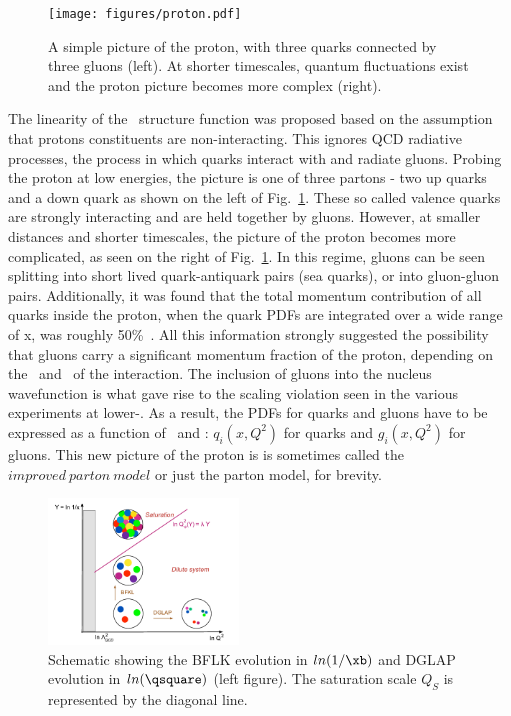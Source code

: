 \begin{figure}
	\centerline{
		\texttt{[image: figures/proton.pdf]} 
	}
	\caption{A simple picture of the proton, with three quarks connected by three gluons (left). At shorter timescales, quantum fluctuations exist and the proton picture becomes more complex (right).  }
	\label{fig:proton}
\end{figure}

The linearity of the \ftwo\ structure function was proposed based on the assumption that protons constituents are non-interacting. This ignores QCD radiative processes, the process in which quarks interact with and radiate gluons. Probing the proton at low energies, the picture is one of three partons - two up quarks and a down quark as shown on the left of Fig.~\ref{fig:proton}. These so called valence quarks are strongly interacting and are held together by gluons. However, at smaller distances and shorter timescales, the picture of the proton becomes more complicated, as seen on the right of Fig.~\ref{fig:proton}. In this regime, gluons can be seen splitting into short lived quark-antiquark pairs (sea quarks), or into gluon-gluon pairs. Additionally, it was found that the total momentum contribution of all quarks inside the proton, when the quark PDFs are integrated over a wide range of x, was roughly 50\%~\cite{qcdbook}. All this information strongly suggested the possibility that gluons carry a significant momentum fraction of the proton, depending on the \xb\ and \qsquare\ of the interaction. The inclusion of gluons into the nucleus wavefunction is what gave rise to the scaling violation seen in the various experiments at lower-\xb. As a result, the PDFs for quarks and gluons have to be expressed as a function of \xb\ and \qsquare: $q_{i}(x,Q^{2})$ for quarks and $g_{i}(x,Q^{2})$ for gluons. This new picture of the proton is is sometimes called the $improved\ parton\ model$ or just the parton model, for brevity.

\begin{figure}
	\centering
	\includegraphics[width=0.45\textwidth]{figures/dglap_bfkl.pdf} 
	\caption{ Schematic showing the BFLK evolution in $ln(1/\xb)$ and DGLAP evolution in $ln(\qsquare)$ (left figure). The saturation scale $Q_{S}$ is represented by the diagonal line.}	
	\label{fig:cgc}
\end{figure}

